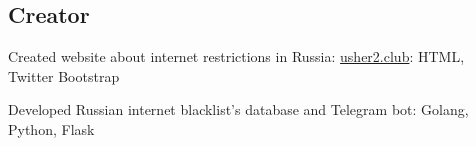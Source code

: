 \documentclass[letter,10pt]{article}
\begin{document}
\subsection{{Creator}}
\begin{zitemize}
\item Created website about internet restrictions in Russia: \href{https://usher2.club}{usher2.club}: HTML, Twitter Bootstrap
\item Developed Russian internet blacklist's database and Telegram bot: Golang, Python, Flask
\end{zitemize}
\end{document}
